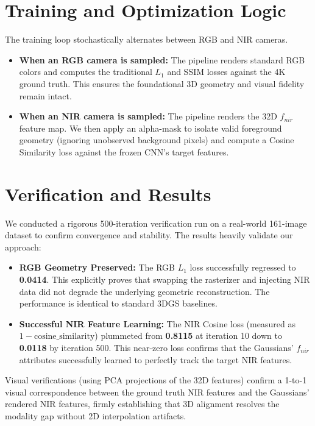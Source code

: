\documentclass[12pt]{article}
\begin{document}
\section{Training and Optimization Logic}
The training loop stochastically alternates between RGB and NIR cameras. 
\begin{itemize}
    \item \textbf{When an RGB camera is sampled:} The pipeline renders standard RGB colors and computes the traditional $L_1$ and SSIM losses against the 4K ground truth. This ensures the foundational 3D geometry and visual fidelity remain intact.
    \item \textbf{When an NIR camera is sampled:} The pipeline renders the 32D $f_{nir}$ feature map. We then apply an alpha-mask to isolate valid foreground geometry (ignoring unobserved background pixels) and compute a Cosine Similarity loss against the frozen CNN's target features. 
\end{itemize}

\section{Verification and Results}
We conducted a rigorous 500-iteration verification run on a real-world 161-image dataset to confirm convergence and stability. The results heavily validate our approach:

\begin{itemize}
    \item \textbf{RGB Geometry Preserved:} The RGB $L_1$ loss successfully regressed to \textbf{0.0414}. This explicitly proves that swapping the rasterizer and injecting NIR data did not degrade the underlying geometric reconstruction. The performance is identical to standard 3DGS baselines.
    \item \textbf{Successful NIR Feature Learning:} The NIR Cosine loss (measured as $1 - \text{cosine\_similarity}$) plummeted from \textbf{0.8115} at iteration 10 down to \textbf{0.0118} by iteration 500. This near-zero loss confirms that the Gaussians' $f_{nir}$ attributes successfully learned to perfectly track the target NIR features.
\end{itemize}

Visual verifications (using PCA projections of the 32D features) confirm a 1-to-1 visual correspondence between the ground truth NIR features and the Gaussians' rendered NIR features, firmly establishing that 3D alignment resolves the modality gap without 2D interpolation artifacts.
\end{document}
